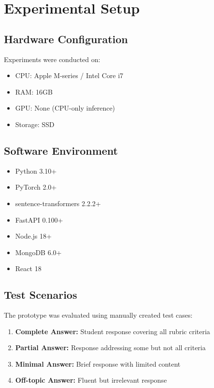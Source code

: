 \documentclass[conference]{IEEEtran}
\begin{document}
\section{Experimental Setup}

\subsection{Hardware Configuration}
Experiments were conducted on:
\begin{itemize}
    \item CPU: Apple M-series / Intel Core i7
    \item RAM: 16GB
    \item GPU: None (CPU-only inference)
    \item Storage: SSD
\end{itemize}

\subsection{Software Environment}
\begin{itemize}
    \item Python 3.10+
    \item PyTorch 2.0+
    \item sentence-transformers 2.2.2+
    \item FastAPI 0.100+
    \item Node.js 18+
    \item MongoDB 6.0+
    \item React 18
\end{itemize}

\subsection{Test Scenarios}
The prototype was evaluated using manually created test cases:
\begin{enumerate}
    \item \textbf{Complete Answer:} Student response covering all rubric criteria
    \item \textbf{Partial Answer:} Response addressing some but not all criteria
    \item \textbf{Minimal Answer:} Brief response with limited content
    \item \textbf{Off-topic Answer:} Fluent but irrelevant response
\end{enumerate}
\end{document}
